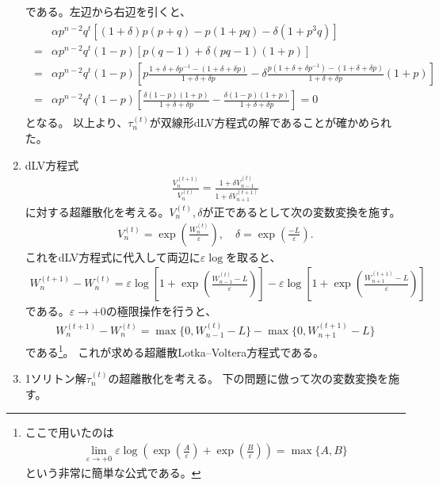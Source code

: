 \documentclass{jsarticle}
\begin{document}
\begin{enumerate}
\begin{align}
\end{align}
である。左辺から右辺を引くと、
\begin{align}
\begin{split}
&\alpha p^{n-2}q^{t}\left[(1+\delta)p(p+q)-p(1+pq)-\delta(1+p^{3}q)\right]\\
=&\alpha p^{n-2}q^{t}(1-p)\left[p(q-1)+\delta(pq-1)(1+p)\right]\\
=&\alpha p^{n-2}q^{t}(1-p)\left[p\frac{1+\delta+\delta p^{-1}-(1+\delta+\delta p)}{1+\delta+\delta p}-\delta\frac{p(1+\delta+\delta p^{-1})-(1+\delta+\delta p)}{1+\delta+\delta p}(1+p)\right]\\
=&\alpha p^{n-2}q^{t}(1-p)\left[\frac{\delta(1-p)(1+p)}{1+\delta+\delta p}-\frac{\delta(1-p)(1+p)}{1+\delta+\delta p}\right]=0
\end{split}
\end{align}
となる。
以上より、$\tau_{n}^{(t)}$が双線形dLV方程式の解であることが確かめられた。
\item 
dLV方程式
\begin{align}
\frac{V_{n}^{(t+1)}}{V_{n}^{(t)}}=\frac{1+\delta V_{n-1}^{(t)}}{1+\delta V_{n+1}^{(t+1)}}
\end{align}
に対する超離散化を考える。$V_{n}^{(t)},\delta$が正であるとして次の変数変換を施す。
\begin{align}
V_{n}^{(t)}=\exp\left(\frac{W_{n}^{(t)}}{\varepsilon}\right),\quad
\delta=\exp\left(\frac{-L}{\varepsilon}\right).
\end{align}
これをdLV方程式に代入して両辺に$\varepsilon\log$を取ると、
\begin{align}
W_{n}^{(t+1)}-W_{n}^{(t)}=\varepsilon\log\left[1+\exp\left(\frac{W_{n-1}^{(t)}-L}{\varepsilon}\right)\right]
-\varepsilon\log\left[1+\exp\left(\frac{W_{n+1}^{(t+1)}-L}{\varepsilon}\right)\right]
\end{align}
である。$\varepsilon\to+0$の極限操作を行うと、
\begin{align}
W_{n}^{(t+1)}-W_{n}^{(t)}
=\max\{0,W_{n-1}^{(t)}-L\}-\max\{0,W_{n+1}^{(t+1)}-L\}
\end{align}
である\footnote{
ここで用いたのは
\begin{align*}
\lim_{\varepsilon\to+0}\varepsilon\log\left(\exp\left(\frac{A}{\varepsilon}\right)+\exp\left(\frac{B}{\varepsilon}\right)\right)
=\max\{A,B\}
\end{align*}
という非常に簡単な公式である。
}。
これが求める超離散Lotka--Voltera方程式である。
\item 
1ソリトン解$\tau_{n}^{(t)}$の超離散化を考える。
下の問題に倣って次の変数変換を施す。

\end{enumerate}
\end{document}
